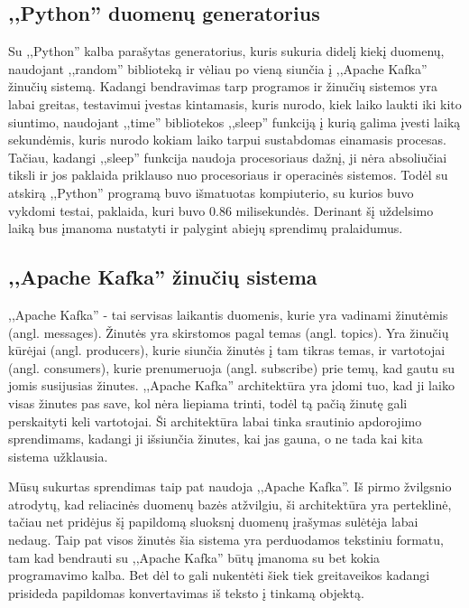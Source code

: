 \documentclass{VUMIFPSkursinis}
\begin{document}
\subsection{,,Python'' duomenų generatorius}

Su ,,Python'' kalba parašytas generatorius, kuris sukuria didelį kiekį duomenų, naudojant ,,random'' biblioteką ir vėliau po vieną siunčia į 
,,Apache Kafka'' žinučių sistemą. Kadangi bendravimas tarp programos ir žinučių sistemos yra labai greitas, testavimui įvestas kintamasis, kuris
nurodo, kiek laiko laukti iki kito siuntimo, naudojant ,,time'' bibliotekos ,,sleep'' funkciją į kurią galima įvesti laiką sekundėmis, kuris
nurodo kokiam laiko tarpui sustabdomas einamasis procesas. Tačiau, kadangi ,,sleep'' funkcija naudoja procesoriaus dažnį, ji nėra absoliučiai tiksli
ir jos paklaida priklauso nuo procesoriaus ir operacinės sistemos\cite{imtiaz20}. Todėl su atskirą ,,Python'' programą buvo išmatuotas kompiuterio,
su kurios buvo vykdomi testai, paklaida, kuri buvo 0.86 milisekundės. Derinant šį uždelsimo laiką bus įmanoma nustatyti ir palygint abiejų sprendimų pralaidumus.

\subsection{,,Apache Kafka'' žinučių sistema}

,,Apache Kafka'' - tai servisas laikantis duomenis, kurie yra vadinami žinutėmis (angl. messages). Žinutės yra skirstomos pagal temas (angl. topics).
Yra žinučių kūrėjai (angl. producers), kurie siunčia žinutės į tam tikras temas, ir vartotojai (angl. consumers), kurie prenumeruoja (angl. subscribe)
prie temų, kad gautu su jomis susijusias žinutes\cite{thein2014apache}. ,,Apache Kafka'' architektūra yra įdomi tuo, kad ji laiko visas žinutes pas save, kol nėra liepiama 
trinti, todėl tą pačią žinutę gali perskaityti keli vartotojai. Ši architektūra labai tinka srautinio apdorojimo sprendimams, kadangi ji išsiunčia žinutes,
kai jas gauna, o ne tada kai kita sistema užklausia. \par 
Mūsų sukurtas sprendimas taip pat naudoja ,,Apache Kafka''. Iš pirmo žvilgsnio atrodytų, 
kad reliacinės duomenų bazės atžvilgiu, ši architektūra yra perteklinė, tačiau net pridėjus šį papildomą sluoksnį duomenų įrašymas sulėtėja labai nedaug.
Taip pat visos žinutės šia sistema yra perduodamos tekstiniu formatu, tam kad bendrauti su ,,Apache Kafka'' būtų įmanoma su bet kokia programavimo kalba.
Bet dėl to gali nukentėti šiek tiek greitaveikos kadangi prisideda papildomas konvertavimas iš teksto į tinkamą objektą.
\end{document}
